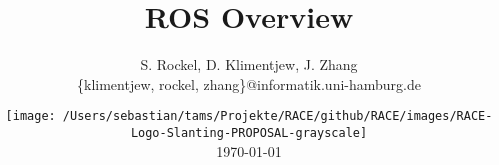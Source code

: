




\title[ROS Overview]{ROS Overview}


\author[S. Rockel, D. Klimentjew, J. Zhang]{S. Rockel, D. Klimentjew, J. Zhang\textbf{}\\
{\small \{klimentjew, rockel, zhang\}@informatik.uni-hamburg.de\vspace{-1em}
}}


\date{\texttt{[image: /Users/sebastian/tams/Projekte/RACE/github/RACE/images/RACE-Logo-Slanting-PROPOSAL-grayscale]}\\
\today}

\makebeamertitle


